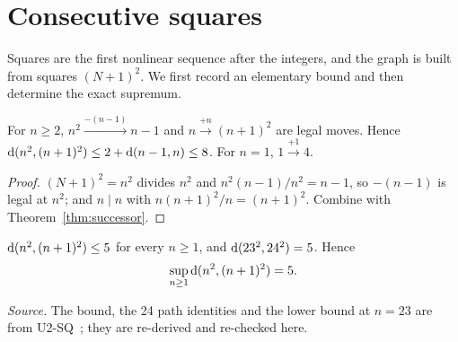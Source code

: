 \section{Consecutive squares}\label{sec:squares}
Squares are the first nonlinear sequence after the integers, and the graph is built from squares $(N+1)^2$. We first record an elementary bound and then determine the exact supremum.

\begin{lemma}\label{lem:sq8}
For $n\ge2$, $n^2\xrightarrow{-(n-1)}n-1$ and $n\xrightarrow{+n}(n+1)^2$ are legal moves. Hence $\operatorname{d}(n^2,(n+1)^2)\le2+\operatorname{d}(n-1,n)\le8$. For $n=1$, $1\xrightarrow{+1}4$.
\end{lemma}
\begin{proof} $(N+1)^2=n^2$ divides $n^2$ and $n^2(n-1)/n^2=n-1$, so $-(n-1)$ is legal at $n^2$; and $n\mid n$ with $n(n+1)^2/n=(n+1)^2$. Combine with Theorem~\ref{thm:successor}. \end{proof}

\begin{theorem}\label{thm:squares}
$\operatorname{d}(n^2,(n+1)^2)\le5$ for every $n\ge1$, and $\operatorname{d}(23^2,24^2)=5$. Hence
\[\sup_{n\ge1}\operatorname{d}(n^2,(n+1)^2)=5.\]
\end{theorem}
\noindent\emph{Source.} The bound, the 24 path identities and the lower bound at $n=23$ are from U2-SQ~\cite{u2sq}; they are re-derived and re-checked here.


